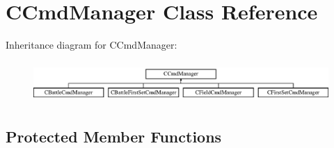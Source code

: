 \hypertarget{class_c_cmd_manager}{}\section{C\+Cmd\+Manager Class Reference}
\label{class_c_cmd_manager}
Inheritance diagram for C\+Cmd\+Manager\+:\begin{figure}[H]
\begin{center}
\leavevmode
\includegraphics[height=1.564246cm]{class_c_cmd_manager}
\end{center}
\end{figure}
\subsection*{Protected Member Functions}
